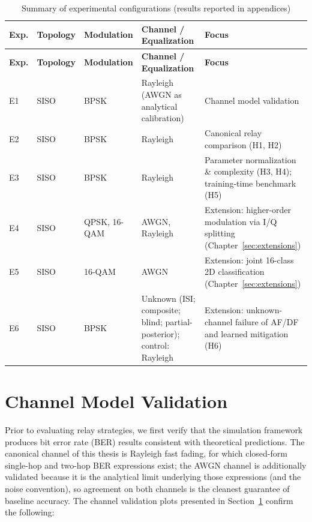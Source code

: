 \begin{longtable}{p{0.6cm} p{2.2cm} p{2.1cm} p{3.6cm} p{3.9cm}}
\caption{Summary of experimental configurations (results reported in appendices)}
\label{tab:experiment-summary}\\
\hline
\textbf{Exp.} &
\textbf{Topology} &
\textbf{Modulation} &
\textbf{Channel / Equalization} &
\textbf{Focus} \\
\hline
\endfirsthead

\hline
\textbf{Exp.} &
\textbf{Topology} &
\textbf{Modulation} &
\textbf{Channel / Equalization} &
\textbf{Focus} \\
\hline
\endhead

E1 & SISO & BPSK &
Rayleigh (AWGN as analytical calibration) &
Channel model validation \\
\hline

E2 & SISO & BPSK &
Rayleigh &
Canonical relay comparison (H1, H2) \\
\hline

E3 & SISO & BPSK &
Rayleigh &
Parameter normalization \& complexity (H3, H4); training-time benchmark (H5) \\
\hline

E4 & SISO & QPSK, 16-QAM &
AWGN, Rayleigh &
Extension: higher-order modulation via I/Q splitting (Chapter~\ref{sec:extensions}) \\
\hline

E5 & SISO & 16-QAM &
AWGN &
Extension: joint 16-class 2D classification (Chapter~\ref{sec:extensions}) \\
\hline

E6 & SISO & BPSK &
Unknown (ISI; composite; blind; partial-posterior); control: Rayleigh &
Extension: unknown-channel failure of AF/DF and learned mitigation (H6) \\

\hline
\end{longtable}

\section{Channel Model Validation}\label{sec:channel-model-validation-simulative}

Prior to evaluating relay strategies, we first verify that the simulation framework produces bit error rate (BER) results consistent with theoretical predictions. The canonical channel of this thesis is Rayleigh fast fading, for which closed-form single-hop and two-hop BER expressions exist; the AWGN channel is additionally validated because it is the analytical limit underlying those expressions (and the noise convention), so agreement on both channels is the cleanest guarantee of baseline accuracy. The channel validation plots presented in Section~\ref{sec:channel-model-validation-simulative} confirm the following:


